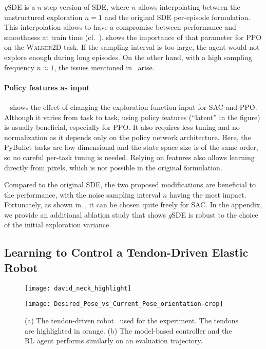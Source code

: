 \documentclass{article}
\newcommand{\cf}{cf.}
\newcommand{\SDE}{\textsc{SDE}\xspace}
\newcommand{\ourSDE}{\textit{g}\textsc{SDE}\xspace}
\newcommand{\ppo}{\textsc{PPO}\xspace}
\newcommand{\sac}{\textsc{SAC}\xspace}
\newcommand{\walker}{\textsc{Walker2D}\xspace}
\begin{document}
\ourSDE is a $n$-step version of \SDE, where $n$ allows interpolating between the unstructured exploration $n=1$ and the original \SDE per-episode formulation.
This interpolation allows to have a compromise between performance and smoothness at train time (\cf\ ).
 shows the importance of that parameter for \ppo on the \walker task.
If the sampling interval is too large, the agent would not explore enough during long episodes.
On the other hand, with a high sampling frequency $n \approx 1$, the issues mentioned in~ arise.

\paragraph{Policy features as input}
~ shows the effect of changing the exploration function input for \sac and \ppo. Although it varies from task to task, using policy features (``latent'' in the figure) is usually beneficial, especially for \ppo. It also requires less tuning and no normalization as it depends only on the policy network architecture. Here, the PyBullet tasks are low dimensional and the state space size is of the same order, so no careful per-task tuning is needed. Relying on features also allows learning directly from pixels, which is not possible in the original formulation.


Compared to the original \SDE, the two proposed modifications are beneficial to the performance, with the noise sampling interval $n$ having the most impact.
Fortunately, as shown in~, it can be chosen quite freely for \sac.
In the appendix, we provide an additional ablation study that shows \ourSDE is robust to the choice of the initial exploration variance.


\subsection{Learning to Control a Tendon-Driven Elastic Robot}
\label{sec:exp-real}
\begin{figure}[h]
  \begin{minipage}[t]{.5\linewidth}
    \centering\texttt{[image: david\_neck\_highlight]}
    \label{fig:david-neck}
  \end{minipage}
  \begin{minipage}[t]{.5\linewidth}
    \centering\texttt{[image: Desired\_Pose\_vs\_Current\_Pose\_orientation-crop]}
    \label{fig:eval-traj}
  \end{minipage}
  \caption{(a) The tendon-driven robot~\citep{reinecke2016structurally} used for the experiment. The tendons are highlighted in orange. (b) The model-based controller and the RL agent performs similarly on an evaluation trajectory.}
\end{figure}
\end{document}
